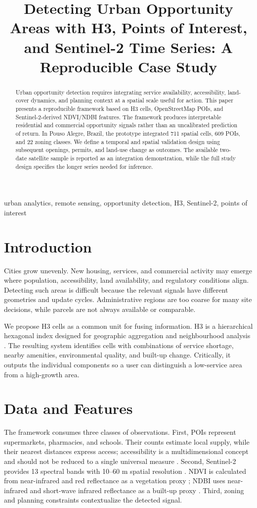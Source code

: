 \documentclass[conference]{IEEEtran}
\title{Detecting Urban Opportunity Areas with H3, Points of Interest, and Sentinel-2 Time Series: A Reproducible Case Study}
\author{\IEEEauthorblockN{Alvaro Careli}\IEEEauthorblockA{Independent Researcher\\Brazil}}
\begin{document}
\maketitle
\begin{abstract}
Urban opportunity detection requires integrating service availability, accessibility, land-cover dynamics, and planning context at a spatial scale useful for action. This paper presents a reproducible framework based on H3 cells, OpenStreetMap POIs, and Sentinel-2-derived NDVI/NDBI features. The framework produces interpretable residential and commercial opportunity signals rather than an uncalibrated prediction of return. In Pouso Alegre, Brazil, the prototype integrated 711 spatial cells, 609 POIs, and 22 zoning classes. We define a temporal and spatial validation design using subsequent openings, permits, and land-use change as outcomes. The available two-date satellite sample is reported as an integration demonstration, while the full study design specifies the longer series needed for inference.
\end{abstract}
\begin{IEEEkeywords}urban analytics, remote sensing, opportunity detection, H3, Sentinel-2, points of interest\end{IEEEkeywords}

\section{Introduction}
Cities grow unevenly. New housing, services, and commercial activity may emerge where population, accessibility, land availability, and regulatory conditions align. Detecting such areas is difficult because the relevant signals have different geometries and update cycles. Administrative regions are too coarse for many site decisions, while parcels are not always available or comparable.

We propose H3 cells as a common unit for fusing information. H3 is a hierarchical hexagonal index designed for geographic aggregation and neighbourhood analysis \cite{h3}. The resulting system identifies cells with combinations of service shortage, nearby amenities, environmental quality, and built-up change. Critically, it outputs the individual components so a user can distinguish a low-service area from a high-growth area.

\section{Data and Features}
The framework consumes three classes of observations. First, POIs represent supermarkets, pharmacies, and schools. Their counts estimate local supply, while their nearest distances express access; accessibility is a multidimensional concept and should not be reduced to a single universal measure \cite{geurs2004accessibility}. Second, Sentinel-2 provides 13 spectral bands with 10--60 m spatial resolution \cite{esaS2}. NDVI is calculated from near-infrared and red reflectance as a vegetation proxy \cite{rouse1974monitoring}; NDBI uses near-infrared and short-wave infrared reflectance as a built-up proxy \cite{zha2003ndbi}. Third, zoning and planning constraints contextualize the detected signal.
\end{document}
